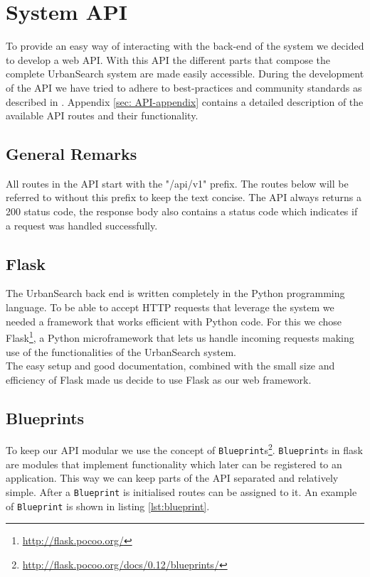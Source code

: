 \section{System API}\label{sec: 5-API}
To provide an easy way of interacting with the back-end of the system we decided to develop a web API. With this API the different parts that compose the complete UrbanSearch system are made easily accessible. During the development of the API we have tried to adhere to best-practices and community standards as described in \cite{apigee}. Appendix \ref{sec: API-appendix} contains a detailed description of the available API routes and their functionality.

\subsection{General Remarks}

All routes in the API start with the "/api/v1" prefix. The routes below will be referred to without this prefix to keep the text concise. The API always returns a 200 status code, the response body also contains a status code which indicates if a request was handled successfully.

\subsection{Flask}
The UrbanSearch back end is written completely in the Python programming language. To be able to accept HTTP requests that leverage the system we needed a framework that works efficient with Python code. For this we chose Flask\footnote{\url{http://flask.pocoo.org/}}, a Python microframework that lets us handle incoming requests making use of the functionalities of the UrbanSearch system.\\
The easy setup and good documentation, combined with the small size and efficiency of Flask made us decide to use Flask as our web framework.

\subsection{Blueprints}
To keep our API modular we use the concept of \texttt{Blueprint}s\footnote{\url{http://flask.pocoo.org/docs/0.12/blueprints/}}. \texttt{Blueprint}s in flask are modules that implement functionality which later can be registered to an application. This way we can keep parts of the API separated and relatively simple. After a \texttt{Blueprint} is initialised routes can be assigned to it. An example of \texttt{Blueprint} is shown in listing \ref{lst:blueprint}.\\

